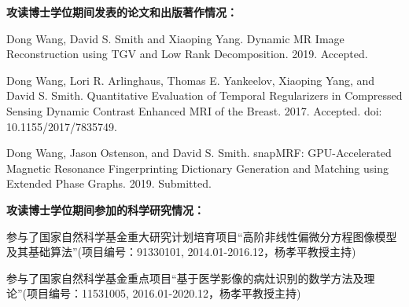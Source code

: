 \begin{publications}{99}
\item[] {\bf{攻读博士学位期间发表的论文和出版著作情况：}}
\item Dong Wang, David S. Smith and Xiaoping Yang. Dynamic MR Image Reconstruction using TGV and Low Rank Decomposition. 2019. Accepted.
\item Dong Wang, Lori R. Arlinghaus, Thomas E. Yankeelov, Xiaoping Yang, and David S. Smith. Quantitative Evaluation of Temporal Regularizers in Compressed Sensing Dynamic Contrast Enhanced MRI of the Breast. 2017. Accepted. doi: 10.1155/2017/7835749.
\item Dong Wang, Jason Ostenson, and David S. Smith. snapMRF: GPU-Accelerated Magnetic Resonance Fingerprinting Dictionary Generation and Matching using Extended Phase Graphs. 2019. Submitted.

\vspace{1.0cm}
\item[] {{\songti{}\bf{攻读博士学位期间参加的科学研究情况：}}}
\setcounter{enumiv}{0}

\item \texttt{}参与了国家自然科学基金重大研究计划培育项目“高阶非线性偏微分方程图像模型及其基础算法”(项目编号：91330101, 2014.01-2016.12，杨孝平教授主持)

\item \texttt{}参与了国家自然科学基金重点项目“基于医学影像的病灶识别的数学方法及理论”(项目编号：11531005, 2016.01-2020.12，杨孝平教授主持)


\end{publications}
